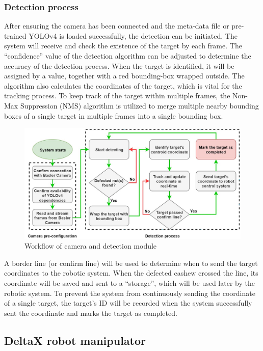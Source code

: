 \documentclass[10pt, letterpaper]{article}
\begin{document}
\subsubsection*{Detection process}
    After ensuring the camera has been connected and the meta-data file or pre-trained YOLOv4 is loaded successfully, the detection can be initiated. The system will receive and check the existence of the target by each frame. The “confidence” value of the detection algorithm can be adjusted to determine the accuracy of the detection process. When the target is identified, it will be assigned by a value, together with a red bounding-box wrapped outside. The algorithm also calculates the coordinates of the target, which is vital for the tracking process. To keep track of the target within multiple frames, the Non-Max Suppression (NMS) algorithm is utilized to merge multiple nearby bounding boxes of a single target in multiple frames into a single bounding box.\par
    \begin{figure}[h]
        \centering
        \includegraphics[width=\textwidth]{fig8.JPG}
        \caption{Workflow of camera and detection module}
    \end{figure}
    A border line (or confirm line) will be used to determine when to send the target coordinates to the robotic system. When the defected cashew crossed the line, its coordinate will be saved and sent to a “storage”, which will be used later by the robotic system. To prevent the system from continuously sending the coordinate of a single target, the target’s ID will be recorded when the system successfully sent the coordinate and marks the target as completed.\par

\subsection{DeltaX robot manipulator}
\end{document}
